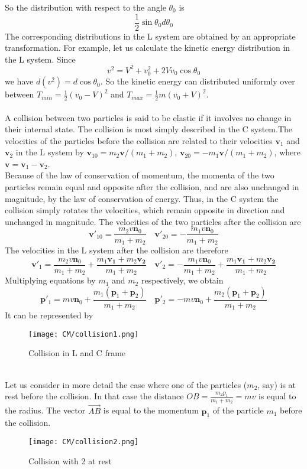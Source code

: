 So the distribution with respect to the angle $\theta_0$ is
\[\frac{1}{2}\sin\theta_0 d\theta_0\]
The corresponding distributions in the L system are obtained by an appropriate transformation. For example, let us calculate the kinetic energy distribution in the L system.
Since
\[v^2 = V^2 + v_0^2 + 2Vv_0\cos\theta_0\] 
we have $d(v^2) = d\cos\theta_0$. So the kinetic energy can distributed uniformly over between $T_{min} = \frac{1}{2}(v_0-V)^2$ and $T_{max}= \frac{1}{2}m(v_0+V)^2$.\\ \\
A collision between two particles is said to be elastic if it involves no change in their internal state. The collision is most simply described in the C system.The velocities of the particles before the collision are related to their velocities $\bm{v}_1$ and
$\bm{v}_2$ in the L system by $\bm{v}_{10} = m_2\bm{v}/(m_1+m_2)$, $\bm{v}_{20} = -m_1\bm{v}/(m_1+m_2)$,
where $\bm{v} = \bm{v}_1-\bm{v}_2$.\\
Because of the law of conservation of momentum, the momenta of the two particles remain equal and opposite after the collision, and are also unchanged in magnitude, by the law of conservation of energy. 
Thus, in the C system the collision simply rotates the velocities, which remain opposite in direction and unchanged in magnitude. The velocities of the two particles after the collision are
\[\bm{v}'_{10} = \frac{m_2v\bm{n}_0}{m_1+m_2} \quad \bm{v}'_{20} = -\frac{m_1v\bm{n}_0}{m_1+m_2}\]
The velocities in the L system after the collision are therefore
\[\bm{v}'_{1} = \frac{m_2v\bm{n}_0}{m_1+m_2} + \frac{m_1\bm{v_1}+m_2\bm{v_2}}{m_1+m_2} \quad \bm{v}'_{2} = -\frac{m_1v\bm{n}_0}{m_1+m_2} + \frac{m_1\bm{v_1}+m_2\bm{v_2}}{m_1+m_2}\]
Multiplying equations by $m_1$ and $m_2$ respectively, we obtain
\[\bm{p}'_{1} = mv\bm{n}_0 + \frac{m_1(\bm{p}_1 + \bm{p}_2)}{m_1+m_2} \quad \bm{p}'_{2} = -mv\bm{n}_0 + \frac{m_2(\bm{p}_1 + \bm{p}_2)}{m_1+m_2}\]
It can be represented by
\begin{figure}[!h]
	\centering
	\texttt{[image: CM/collision1.png]}
	\caption{Collision in L and C frame}
\end{figure}\\
Let us consider in more detail the case where one of the particles ($m_2$, say) is at rest before the collision. In that case the distance $OB = \frac{m_2p_1}{m_1+m_2} = mv$ is equal to the radius. The vector $\vec{AB}$ is equal to the
momentum $\bm{p}_1$ of the particle $m_1$ before the collision.
\begin{figure}[!h]
	\centering
	\texttt{[image: CM/collision2.png]}
	\caption{Collision with 2 at rest}
\end{figure}\\
